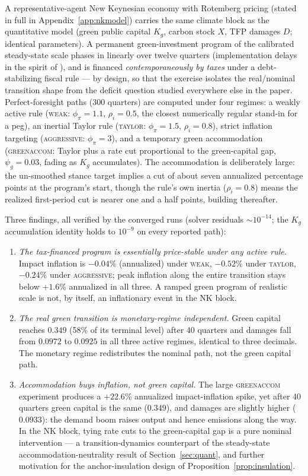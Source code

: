 \documentclass[12pt]{article}
\begin{document}
A representative-agent New Keynesian economy with Rotemberg pricing (stated
in full in Appendix~\ref{app:nkmodel}) carries
the same climate block as the quantitative model (green public capital
$K_g$, carbon stock $X$, TFP damages $D$; identical parameters). A
permanent green-investment program of the calibrated steady-state scale
phases in linearly over twelve quarters (implementation delays in the
spirit of \citet{leeperwalkeryang2010}), and is financed \emph{contemporaneously by
taxes} under a debt-stabilizing fiscal rule --- by design, so that the
exercise isolates the real/nominal transition shape from the deficit
question studied everywhere else in the paper. Perfect-foresight paths
(300 quarters) are computed under four regimes: a weakly active rule
(\textsc{weak}: $\phi_\pi=1.1$, $\rho_i=0.5$, the closest numerically
regular stand-in for a peg), an inertial Taylor rule (\textsc{taylor}:
$\phi_\pi=1.5$, $\rho_i=0.8$), strict inflation targeting
(\textsc{aggressive}: $\phi_\pi=3$), and a temporary green accommodation
(\textsc{greenaccom}: Taylor plus a rate cut proportional to the
green-capital gap, $\psi_g=0.03$, fading as $K_g$ accumulates). The
accommodation is deliberately large: the un-smoothed stance target implies
a cut of about seven annualized percentage points at the program's start,
though the rule's own inertia ($\rho_i=0.8$) means the realized first-period
cut is nearer one and a half points, building thereafter.

Three findings, all verified by the converged runs (solver residuals
$\sim 10^{-14}$; the $K_g$ accumulation identity holds to $10^{-9}$ on
every reported path):

\begin{enumerate}
\item \emph{The tax-financed program is essentially price-stable under any
active rule.} Impact inflation is $-0.04$\% (annualized) under
\textsc{weak}, $-0.52$\% under \textsc{taylor}, $-0.24$\% under
\textsc{aggressive}; peak inflation along the entire transition stays
below $+1.6$\% annualized in all three. A ramped green program of
realistic scale is not, by itself, an inflationary event in the NK block.
\item \emph{The real green transition is monetary-regime independent.}
Green capital reaches $0.349$ (58\% of its terminal level) after 40
quarters and damages fall from $0.0972$ to $0.0925$ in all three active
regimes, identical to three decimals. The monetary regime redistributes
the nominal path, not the green capital path.
\item \emph{Accommodation buys inflation, not green capital.} The large
\textsc{greenaccom} experiment produces a $+22.6$\% annualized
impact-inflation spike, yet after 40 quarters green capital is the same
($0.349$), and damages are slightly higher ($0.0933$): the
demand boom raises output and hence emissions along the way. In the NK
block, tying rate cuts to the green-capital gap is a pure nominal
intervention --- a transition-dynamics counterpart of the steady-state
accommodation-neutrality result of Section~\ref{sec:quant}, and further
motivation for the anchor-insulation design of
Proposition~\ref{prop:insulation}.
\end{enumerate}
\end{document}
